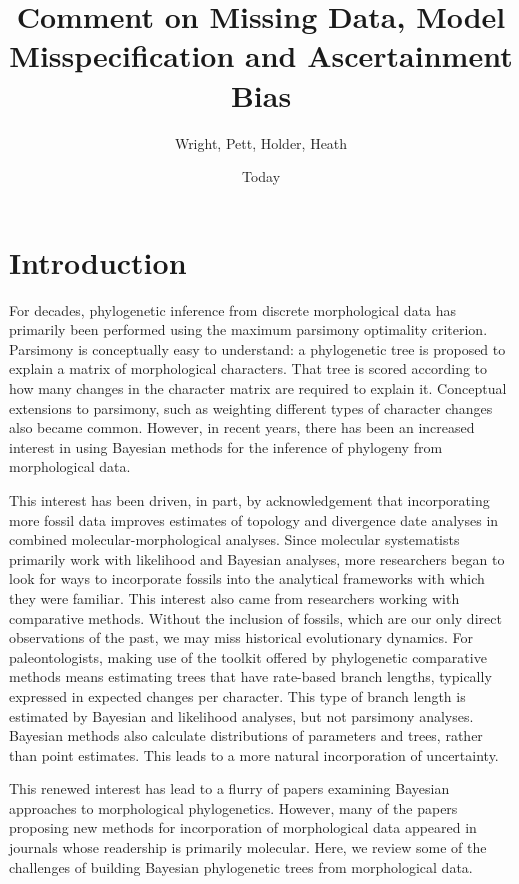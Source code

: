 \documentclass[]{article}
\begin{document}
\title{Comment on Missing Data, Model Misspecification and Ascertainment Bias}
\author{Wright, Pett, Holder, Heath}
\date{Today}
\maketitle

\section{Introduction}
	For decades, phylogenetic inference from discrete morphological data has primarily been performed using the maximum parsimony optimality criterion. 
	Parsimony is conceptually easy to understand: a phylogenetic tree is proposed to explain a matrix of morphological characters.
	That tree is scored according to how many changes in the character matrix are required to explain it.
	Conceptual extensions to parsimony, such as weighting different types of character changes also became common. 
	However, in recent years, there has been an increased interest in using Bayesian methods for the inference of phylogeny from morphological data. 
	\par
	This interest has been driven, in part, by acknowledgement that incorporating more fossil data improves estimates of topology and divergence date analyses in combined molecular-morphological analyses.
	Since molecular systematists primarily work with likelihood and Bayesian analyses, more researchers began to look for ways to incorporate fossils into the analytical frameworks with which they were familiar.
	This interest also came from researchers working with comparative methods.
	Without the inclusion of fossils, which are our only direct observations of the past, we may miss historical evolutionary dynamics.
	For paleontologists, making use of the toolkit offered by phylogenetic comparative methods means estimating trees that have rate-based branch lengths, typically expressed in expected changes per character.
	This type of branch length is estimated by Bayesian and likelihood analyses, but not parsimony analyses. 
	Bayesian methods also calculate distributions of parameters and trees, rather than point estimates.
	This leads to a more natural incorporation of uncertainty. \par
	This renewed interest has lead to a flurry of papers examining Bayesian approaches to morphological phylogenetics.
	However, many of the papers proposing new methods for incorporation of morphological data appeared in journals whose readership is primarily molecular. 
	Here, we review some of the challenges of building Bayesian phylogenetic trees from morphological data.
\end{document}

